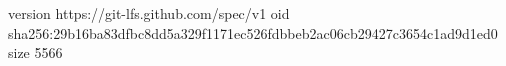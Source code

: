 version https://git-lfs.github.com/spec/v1
oid sha256:29b16ba83dfbc8dd5a329f1171ec526fdbbeb2ac06cb29427c3654c1ad9d1ed0
size 5566
